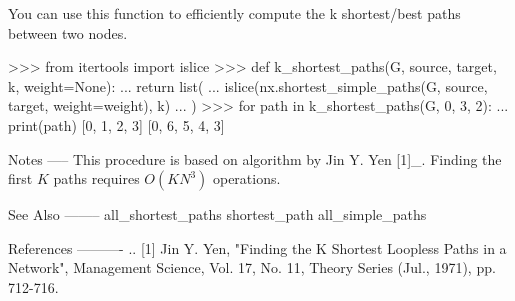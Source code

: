 \begin{DoxyVerb}
You can use this function to efficiently compute the k shortest/best
paths between two nodes.

>>> from itertools import islice
>>> def k_shortest_paths(G, source, target, k, weight=None):
...     return list(
...         islice(nx.shortest_simple_paths(G, source, target, weight=weight), k)
...     )
>>> for path in k_shortest_paths(G, 0, 3, 2):
...     print(path)
[0, 1, 2, 3]
[0, 6, 5, 4, 3]

Notes
-----
This procedure is based on algorithm by Jin Y. Yen [1]_.  Finding
the first $K$ paths requires $O(KN^3)$ operations.

See Also
--------
all_shortest_paths
shortest_path
all_simple_paths

References
----------
.. [1] Jin Y. Yen, "Finding the K Shortest Loopless Paths in a
   Network", Management Science, Vol. 17, No. 11, Theory Series
   (Jul., 1971), pp. 712-716.\end{DoxyVerb}
 